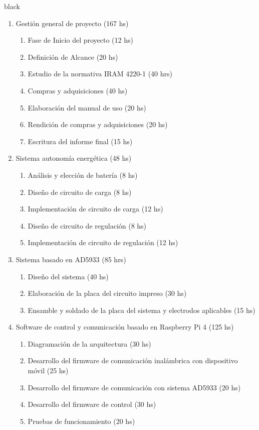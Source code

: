 \documentclass[11pt]{charter}
\begin{document}
\begin{consigna}{black}

\begin{enumerate}
\item Gestión general de proyecto (167 hs)
	\begin{enumerate}
	\item Fase de Inicio del proyecto (12 hs)
	\item Definición de Alcance  (20 hs)
	\item Estudio de la normativa IRAM 4220-1 (40 hrs)
	\item Compras y adquisiciones (40 hs)
	\item Elaboración del manual de uso (20 hs)
	\item Rendición de compras y adquisiciones (20 hs)
	\item Escritura del informe final (15 hs)
	\end{enumerate}

\item Sistema autonomía energética (48 hs)
 	\begin{enumerate}
 	\item Análisis y elección de batería (8 hs)
 	\item Diseño de circuito de carga (8 hs)
 	\item Implementación de circuito de carga (12 hs)
 	\item Diseño de circuito de regulación (8 hs)
 	\item Implementación de circuito de regulación (12 hs)
 	\end{enumerate}

\item Sistema basado en AD5933 (85 hrs)
	\begin{enumerate}
	\item Diseño del sistema (40 hs)
	\item Elaboración de la placa del circuito impreso (30 hs)
	\item Ensamble y soldado de la placa del sistema y electrodos aplicables (15 hs)
	\end{enumerate}

\item Software de control y comunicación basado en Raspberry Pi 4 (125 hs)
	\begin{enumerate}
	\item Diagramación de la arquitectura (30 hs)
	\item Desarrollo del firmware de comunicación inalámbrica con dispositivo móvil (25 hs)
	\item Desarrollo del firmware de comunicación con sistema AD5933 (20 hs)
	\item Desarrollo del firmware de control (30 hs)
	\item Pruebas de funcionamiento (20 hs)
	\end{enumerate}


\end{enumerate}
\end{consigna}
\end{document}
